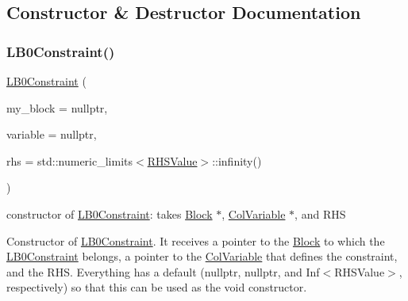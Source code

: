\subsection{Constructor \& Destructor Documentation}
\mbox{\label{class_s_m_spp__di__unipi__it_1_1_l_b0_constraint_a76ca4d663bcddf3dd18aff813e18c0c3}} 
\subsubsection{\texorpdfstring{L\+B0\+Constraint()}{LB0Constraint()}}
{\footnotesize\ttfamily \mbox{\hyperlink{class_s_m_spp__di__unipi__it_1_1_l_b0_constraint}{L\+B0\+Constraint}} (\begin{DoxyParamCaption}\item[{\mbox{\hyperlink{class_s_m_spp__di__unipi__it_1_1_block}{Block}} $\ast$}]{my\+\_\+block = {\ttfamily nullptr},  }\item[{\mbox{\hyperlink{class_s_m_spp__di__unipi__it_1_1_col_variable}{Col\+Variable}} $\ast$const}]{variable = {\ttfamily nullptr},  }\item[{\mbox{\hyperlink{class_s_m_spp__di__unipi__it_1_1_row_constraint_a34abd4b01d3a2024be5f6d13dd88779f}{c\+\_\+\+R\+H\+S\+Value}}}]{rhs = {\ttfamily std\+:\+:numeric\+\_\+limits$<$\mbox{\hyperlink{class_s_m_spp__di__unipi__it_1_1_row_constraint_a8813536ab3b13a81c8e83a999ade3bd8}{R\+H\+S\+Value}}$>$\+:\+:infinity()} }\end{DoxyParamCaption})\hspace{0.3cm}{\ttfamily [inline]}}



constructor of \mbox{\hyperlink{class_s_m_spp__di__unipi__it_1_1_l_b0_constraint}{L\+B0\+Constraint}}\+: takes \mbox{\hyperlink{class_s_m_spp__di__unipi__it_1_1_block}{Block}} $\ast$, \mbox{\hyperlink{class_s_m_spp__di__unipi__it_1_1_col_variable}{Col\+Variable}} $\ast$, and R\+HS 

Constructor of \mbox{\hyperlink{class_s_m_spp__di__unipi__it_1_1_l_b0_constraint}{L\+B0\+Constraint}}. It receives a pointer to the \mbox{\hyperlink{class_s_m_spp__di__unipi__it_1_1_block}{Block}} to which the \mbox{\hyperlink{class_s_m_spp__di__unipi__it_1_1_l_b0_constraint}{L\+B0\+Constraint}} belongs, a pointer to the \mbox{\hyperlink{class_s_m_spp__di__unipi__it_1_1_col_variable}{Col\+Variable}} that defines the constraint, and the R\+HS. Everything has a default (nullptr, nullptr, and Inf$<$\+R\+H\+S\+Value$>$, respectively) so that this can be used as the void constructor. 

